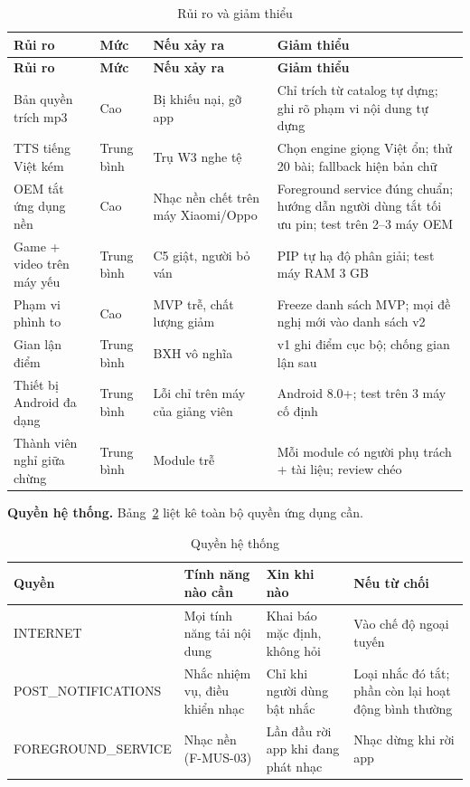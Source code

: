 \begin{longtable}{>{\raggedright\arraybackslash}p{3.9cm} >{\centering\arraybackslash}p{1.1cm} >{\raggedright\arraybackslash}p{5.4cm} >{\raggedright\arraybackslash}p{4.2cm}}
\caption{Rủi ro và giảm thiểu}
\label{tab:risk-register}\\
\toprule
\textbf{Rủi ro} & \textbf{Mức} & \textbf{Nếu xảy ra} & \textbf{Giảm thiểu} \\
\midrule
\endfirsthead
\toprule
\textbf{Rủi ro} & \textbf{Mức} & \textbf{Nếu xảy ra} & \textbf{Giảm thiểu} \\
\midrule
\endhead
\bottomrule
\endfoot
Bản quyền trích mp3 & Cao & Bị khiếu nại, gỡ app & Chỉ trích từ catalog tự dựng; ghi rõ phạm vi nội dung tự dựng \\
TTS tiếng Việt kém & Trung bình & Trụ W3 nghe tệ & Chọn engine giọng Việt ổn; thử 20 bài; fallback hiện bản chữ \\
OEM tắt ứng dụng nền & Cao & Nhạc nền chết trên máy Xiaomi/Oppo & Foreground service đúng chuẩn; hướng dẫn người dùng tắt tối ưu pin; test trên 2--3 máy OEM \\
Game + video trên máy yếu & Trung bình & C5 giật, người bỏ ván & PIP tự hạ độ phân giải; test máy RAM 3 GB \\
Phạm vi phình to & Cao & MVP trễ, chất lượng giảm & Freeze danh sách MVP; mọi đề nghị mới vào danh sách v2 \\
Gian lận điểm & Trung bình & BXH vô nghĩa & v1 ghi điểm cục bộ; chống gian lận sau \\
Thiết bị Android đa dạng & Trung bình & Lỗi chỉ trên máy của giảng viên & Android 8.0+; test trên 3 máy cố định \\
Thành viên nghỉ giữa chừng & Trung bình & Module trễ & Mỗi module có người phụ trách + tài liệu; review chéo \\
\end{longtable}

\textbf{Quyền hệ thống.} Bảng~\ref{tab:permissions} liệt kê toàn bộ quyền ứng dụng cần.

\begin{table}[H]
\caption{Quyền hệ thống}
\label{tab:permissions}
\centering
\begin{tabularx}{\textwidth}{>{\raggedright\arraybackslash}p{3.4cm} >{\raggedright\arraybackslash}p{4.6cm} >{\raggedright\arraybackslash}p{3.7cm} >{\raggedright\arraybackslash}p{3.0cm}}
\toprule
\textbf{Quyền} & \textbf{Tính năng nào cần} & \textbf{Xin khi nào} & \textbf{Nếu từ chối} \\
\midrule
INTERNET & Mọi tính năng tải nội dung & Khai báo mặc định, không hỏi & Vào chế độ ngoại tuyến \\
POST\_\newline NOTIFICATIONS & Nhắc nhiệm vụ, điều khiển nhạc & Chỉ khi người dùng bật nhắc & Loại nhắc đó tắt; phần còn lại hoạt động bình thường \\
FOREGROUND\_\newline SERVICE & Nhạc nền (F-MUS-03) & Lần đầu rời app khi đang phát nhạc & Nhạc dừng khi rời app \\
\bottomrule
\end{tabularx}
\end{table}

